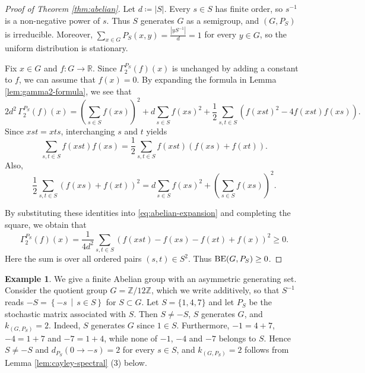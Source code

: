 \documentclass[a4paper, reqno, 11pt]{amsart}
\theoremstyle{definition}
\newtheorem{Exa}[Thm]{Example}
\begin{document}
\begin{proof}[Proof of Theorem \ref{thm:abelian}]
Let $d \coloneqq |S|$.
Every $s \in S$ has finite order, so $s^{-1}$ is a non-negative power of $s$.
Thus $S$ generates $G$ as a semigroup, and $(G,P_S)$ is irreducible.
Moreover, $\sum_{x \in G} P_S(x,y) = \frac{|yS^{-1}|}{d} = 1$ for every $y \in G$,
so the uniform distribution is stationary.

Fix $x \in G$ and $f \colon G \to \mathbb{R}$.
Since $\Gamma_2^{P_S}(f)(x)$ is unchanged by adding a constant to $f$, we can assume that $f(x)=0$.
By expanding the formula in Lemma \ref{lem:gamma2-formula}, we see that 
\begin{equation}\label{eq:abelian-expansion}
2d^2\,\Gamma_2^{P_S}(f)(x) = \left(\sum_{s \in S} f(xs)\right)^2+d\sum_{s \in S} f(xs)^2 + \frac12\sum_{s,t \in S}\left(f(xst)^2-4f(xst)f(xs)\right).
\end{equation}
Since $xst=xts$, interchanging $s$ and $t$ yields
\[ \sum_{s,t \in S} f(xst)f(xs) = \frac12\sum_{s,t \in S} f(xst)\left(f(xs)+f(xt)\right). \]
Also,
\[ \frac12 \sum_{s,t \in S}\left(f(xs)+f(xt)\right)^2 = d\sum_{s \in S} f(xs)^2+\left(\sum_{s \in S} f(xs)\right)^2.\]

By substituting these identities into \eqref{eq:abelian-expansion} and completing the square,
we obtain that 
\begin{equation}\label{eq:abelian-squares}
\Gamma_2^{P_S}(f)(x) = \frac{1}{4d^2}\sum_{s,t \in S}\left(f(xst)-f(xs)-f(xt)+f(x)\right)^2\ge0.
\end{equation}
Here the sum is over all ordered pairs $(s,t) \in S^2$.
Thus $\textup{BE}(G,P_S)\ge0$.
\end{proof}



\begin{Exa}\label{exa:z12}
We give a finite Abelian group with an asymmetric generating set.
Consider the quotient group $G = \mathbb{Z} / 12\mathbb{Z}$, which we write additively, so that $S^{-1}$ reads $-S = \left\{-s \,\middle|\, s \in S\right\}$ for $S \subset G$.
Let $S = \{1,4,7\}$ and let $P_S$ be the stochastic matrix associated with $S$.
Then $S \ne -S$, $S$ generates $G$, and $k_{(G, P_S)} = 2$. 
Indeed, $S$ generates $G$ since $1 \in S$.
Furthermore, $-1 = 4 + 7$, $-4 = 1 + 7$ and $-7 = 1 + 4$, while none of $-1$, $-4$ and $-7$ belongs to $S$.
Hence $S \ne -S$ and $d_{P_S}(0 \to -s) = 2$ for every $s \in S$, and $k_{(G, P_S)} = 2$ follows from Lemma \ref{lem:cayley-spectral} (3) below.
\end{Exa}
\end{document}
